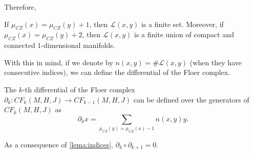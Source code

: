 Therefore,

\begin{lema} \label{lema:indices}
If $\mu_{CZ}(x) = \mu_{CZ}(y) + 1$, then $\mathcal{L}(x,y)$ is a finite set. Moreover, if $\mu_{CZ}(x) = \mu_{CZ}(y) + 2$, then $\mathcal{L}(x,y)$ is a finite union of compact and connected $1$-dimensional manifolds.
\end{lema}

With this in mind, if we denote by $n(x,y) = \# \mathcal{L}(x,y)$ (when they have consecutive indices), we can define the differential of the Floer complex.

\begin{deff}
The $k$-th differential of the Floer complex $\partial_k : CF_k(M,H,J) \rightarrow CF_{k-1}(M,H,J)$ can be defined over the generators of $CF_k(M,H,J)$ as
\[\partial_kx = \sum_{\mu_{CZ}(y) = \mu_{CZ}(x) -1} n(x,y)y .\]
\end{deff}

As a consequence of \ref{lema:indices}, $\partial_k \circ \partial_{k+1} = 0$.
